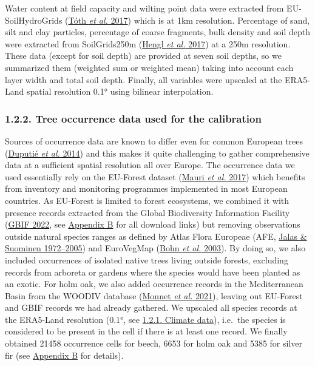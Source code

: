 \documentclass[11pt,]{article}
\begin{document}
Water content at field capacity and wilting point data were extracted
from EU-SoilHydroGrids (\protect\hyperlink{ref-Toth2017}{Tóth \emph{et
al.} 2017}) which is at 1km resolution. Percentage of sand, silt and
clay particles, percentage of coarse fragments, bulk density and soil
depth were extracted from SoilGrids250m
(\protect\hyperlink{ref-Hengl2017}{Hengl \emph{et al.} 2017}) at a 250m
resolution. These data (except for soil depth) are provided at seven
soil depths, so we summarized them (weighted sum or weighted mean)
taking into account each layer width and total soil depth. Finally, all
variables were upscaled at the ERA5-Land spatial resolution 0.1° using
bilinear interpolation.

\hypertarget{occurrencedata}{%
\subsubsection{1.2.2. Tree occurrence data used for the
calibration}\label{occurrencedata}}

Sources of occurrence data are known to differ even for common European
trees (\protect\hyperlink{ref-Duputie2014}{Duputié \emph{et al.} 2014})
and this makes it quite challenging to gather comprehensive data at a
sufficient spatial resolution all over Europe. The occurrence data we
used essentially rely on the EU-Forest dataset
(\protect\hyperlink{ref-Mauri2017}{Mauri \emph{et al.} 2017}) which
benefits from inventory and monitoring programmes implemented in most
European countries. As EU-Forest is limited to forest ecosystems, we
combined it with presence records extracted from the Global Biodiversity
Information Facility (\protect\hyperlink{ref-GBIF2022}{GBIF 2022}, see
\protect\hyperlink{appendixB}{Appendix B} for all download links) but
removing observations outside natural species ranges as defined by Atlas
Flora Europeae (AFE, \protect\hyperlink{ref-AFE2005}{Jalas \& Suominen
1972--2005}) and EuroVegMap (\protect\hyperlink{ref-EVM2003}{Bohn
\emph{et al.} 2003}). By doing so, we also included occurrences of
isolated native trees living outside forests, excluding records from
arboreta or gardens where the species would have been planted as an
exotic. For holm oak, we also added occurrence records in the
Mediterranean Basin from the WOODIV database
(\protect\hyperlink{ref-Monnet2021}{Monnet \emph{et al.} 2021}), leaving
out EU-Forest and GBIF records we had already gathered. We upscaled all
species records at the ERA5-Land resolution (0.1°, see
\protect\hyperlink{climatedata}{1.2.1. Climate data}), i.e.~the species
is considered to be present in the cell if there is at least one record.
We finally obtained 21458 occurrence cells for beech, 6653 for holm oak
and 5385 for silver fir (see \protect\hyperlink{appendixB}{Appendix B}
for details).
\end{document}
